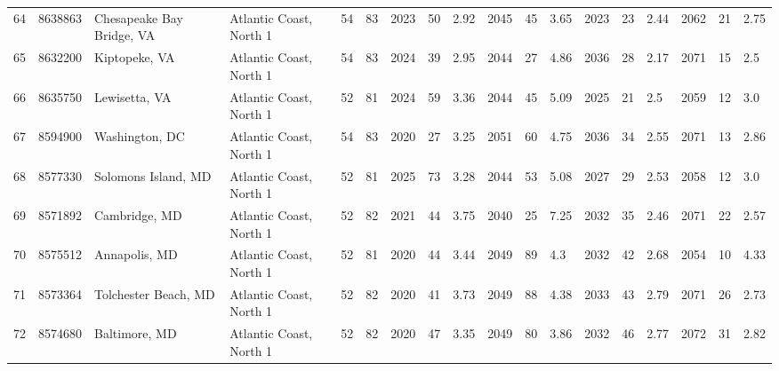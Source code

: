 \begin{longtable}{llllllllllllllllll}
64 &          8638863 &   Chesapeake Bay Bridge, VA &  Atlantic Coast, North 1 &              54 &       83 &                      2023 &   50 &   2.92 &     2045 &   45 &   3.65 &                          2023 &  23 &  2.44 &     2062 &   21 &  2.75 \\
65 &          8632200 &               Kiptopeke, VA &  Atlantic Coast, North 1 &              54 &       83 &                      2024 &   39 &   2.95 &     2044 &   27 &   4.86 &                          2036 &  28 &  2.17 &     2071 &   15 &   2.5 \\
66 &          8635750 &               Lewisetta, VA &  Atlantic Coast, North 1 &              52 &       81 &                      2024 &   59 &   3.36 &     2044 &   45 &   5.09 &                          2025 &  21 &   2.5 &     2059 &   12 &   3.0 \\
67 &          8594900 &              Washington, DC &  Atlantic Coast, North 1 &              54 &       83 &                      2020 &   27 &   3.25 &     2051 &   60 &   4.75 &                          2036 &  34 &  2.55 &     2071 &   13 &  2.86 \\
68 &          8577330 &         Solomons Island, MD &  Atlantic Coast, North 1 &              52 &       81 &                      2025 &   73 &   3.28 &     2044 &   53 &   5.08 &                          2027 &  29 &  2.53 &     2058 &   12 &   3.0 \\
69 &          8571892 &               Cambridge, MD &  Atlantic Coast, North 1 &              52 &       82 &                      2021 &   44 &   3.75 &     2040 &   25 &   7.25 &                          2032 &  35 &  2.46 &     2071 &   22 &  2.57 \\
70 &          8575512 &               Annapolis, MD &  Atlantic Coast, North 1 &              52 &       81 &                      2020 &   44 &   3.44 &     2049 &   89 &    4.3 &                          2032 &  42 &  2.68 &     2054 &   10 &  4.33 \\
71 &          8573364 &        Tolchester Beach, MD &  Atlantic Coast, North 1 &              52 &       82 &                      2020 &   41 &   3.73 &     2049 &   88 &   4.38 &                          2033 &  43 &  2.79 &     2071 &   26 &  2.73 \\
72 &          8574680 &               Baltimore, MD &  Atlantic Coast, North 1 &              52 &       82 &                      2020 &   47 &   3.35 &     2049 &   80 &   3.86 &                          2032 &  46 &  2.77 &     2072 &   31 &  2.82 \\

\end{longtable}
